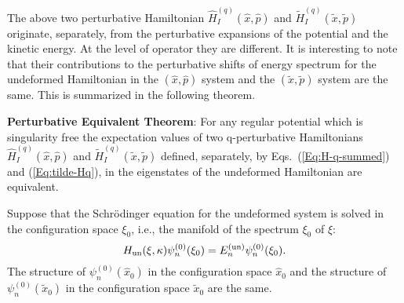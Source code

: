 \documentclass[a4paper,12pt]{article}
\begin{document}
The above two perturbative Hamiltonian $\hat H^{(q)}_I (\hat x,\hat p)$ and 
$\tilde H^{(q)}_I (\tilde x,\tilde p)$ originate,  separately, from the 
perturbative expansions  of the potential and the kinetic energy.
At the level of operator they are different.
 It is interesting to note that their contributions to the perturbative
 shifts of energy spectrum for the undeformed  Hamiltonian in the
 $(\hat x,\hat p)$ system and the $(\tilde  x,\tilde p)$  system  are the same.
 This is summarized in the following theorem.

{\bf Perturbative Equivalent Theorem}:  For any regular potential  which 
is singularity free the expectation
 values of two q-perturbative Hamiltonians $\hat H^{(q)}_I (\hat x,\hat p)$ 
and $\tilde H^{(q)}_I (\tilde x,\tilde p)$ defined,  separately, by 
 Eqs.~(\ref{Eq:H-q-summed}) and (\ref{Eq:tilde-Hq}), 
 in the eigenstates of the undeformed  Hamiltonian are equivalent.

Suppose that the Schr\"odinger equation for the undeformed system is solved in 
the configuration space $\xi_0$, i.e., the manifold of the spectrum $\xi_0$ of 
$\xi$:
\begin{equation}                          
\label{Eq:Hun-xi}  
H_{\rm un}(\xi,\kappa)\psi_n^{(0)}(\xi_0)=
E^{\rm (un)}_n\psi_n^{(0)}(\xi_0).
\end{equation}
The structure of $\psi_n^{(0)}(\hat x_0)$ in the configuration space 
$\hat x_0$ and the structure of $\psi_n^{(0)}(\tilde x_0)$ in the 
configuration space $\tilde x_0$ are the same.
\end{document}

